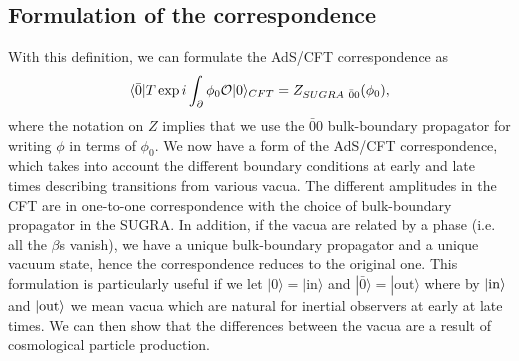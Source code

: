\documentclass[a4paper,aps,prd,preprintnumbers,groupedaddress]{revtex4}
\begin{document}
\subsection{Formulation of the correspondence}
With this definition, we can formulate the AdS/CFT correspondence as
\begin{equation} \label{ads cft}
\langle \bar{0} | T \exp i \int_\partial \phi_0 {\cal O} | 0 \rangle_{CFT} = Z_{SUGRA \ \bar{0} 0} (\phi_0) ,
\end{equation}
where the notation on $Z$ implies that we use the $\bar{0} 0$ bulk-boundary propagator for writing $\phi$ in terms of $\phi_0$. We now have a
form of the AdS/CFT correspondence, which takes into account the different boundary conditions at early and late times describing
transitions from various vacua.    The different amplitudes in the CFT are in one-to-one correspondence with the choice of
bulk-boundary propagator in the SUGRA.   In addition, if the vacua are related by a phase (i.e. all the $\beta$s vanish), we have a unique
bulk-boundary propagator and a unique vacuum state, hence the correspondence reduces to the original one. This formulation is particularly
useful if we let $|0 \rangle = |\mathrm{{ in} }\rangle$  and $| \bar{0} \rangle=|\mathrm{{out}}\rangle$ where by $|\rm{in}\rangle$ and $|\rm{out}\rangle$ we mean vacua which are natural for inertial observers
at early at late times.
We can then show that the differences between the vacua are
a result of cosmological particle production.
\end{document}

